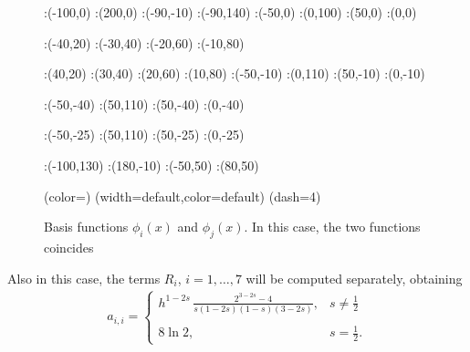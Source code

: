 \begin{figure}[h]
\figinit{0.8pt}
:(-100,0) :(200,0)
:(-90,-10) :(-90,140)
:(-50,0) :(0,100) 
:(50,0) :(0,0)

:(-40,20) :(-30,40) 
:(-20,60) :(-10,80)

:(40,20) :(30,40) 
:(20,60) :(10,80)
%
:(-50,-10) :(0,110) 
:(50,-10) :(0,-10)

:(-50,-40) :(50,110) 
:(50,-40) :(0,-40)

:(-50,-25) :(50,110) 
:(50,-25) :(0,-25)

:(-100,130) :(180,-10)
:(-50,50) :(80,50)

\figdrawbegin{}
\figdrawarrow[1,2]
\figset (color=\Redrgb)
\figdrawline[3,4]
\figdrawline[4,5]
\figset (width=default,color=default)
\figset(dash=4)
\figdrawline[4,6]
\figdrawline[41,61]
\figdrawarrow[11,12]

\figdrawend

\centerline{\box\figBoxA}
\caption{Basis functions $\phi_i(x)$ and $\phi_j(x)$. In this case, the two functions coincides}\label{basis_dia}
\end{figure}

Also in this case, the terms $R_i$, $i=1,\ldots,7$ will be computed separately, obtaining
\begin{align*}
	a_{i,i} = \begin{cases}
			\displaystyle h^{1-2s}\,\frac{2^{3-2s}-4}{s(1-2s)(1-s)(3-2s)}, & \displaystyle s\neq\frac{1}{2}
			\\
			\\
			8\ln 2, & \displaystyle s=\frac{1}{2}.			
			\end{cases}	
\end{align*}

